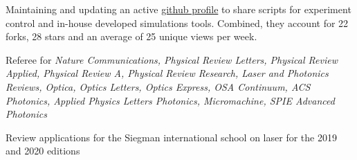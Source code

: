 \documentclass[11pt, letterpaper]{customcv}
\begin{document}
%
{
    {
      \begin{cvitems} %
            \item {Maintaining and updating an active \href{https://github.com/gregmoille}{github profile}} to share scripts for experiment control and in-house developed simulations tools. Combined, they account for 22 forks, 28 stars and an average of 25 unique views per week. 
      \end{cvitems}
    }
    {
      \begin{cvitems} %
            \item {Referee for \textit{Nature Communications, Physical Review Letters, Physical Review Applied, Physical Review A, Physical Review Research, Laser and Photonics Reviews, Optica, Optics Letters, Optics Express, OSA Continuum, ACS Photonics, Applied Physics Letters Photonics, Micromachine, SPIE Advanced Photonics}}
      \end{cvitems}
    }
    {
      \begin{cvitems} %
            \item {Review applications for the Siegman international school on laser for the 2019 and 2020 editions}
      \end{cvitems}
    }
}

%
{
    \hfill%
    \hfill%
    \hfill%
     \hfill%
}
\end{document}
